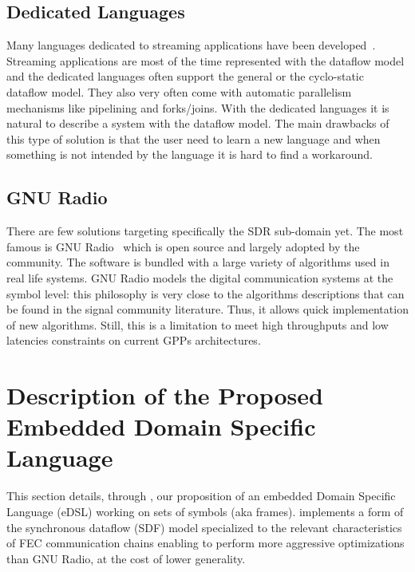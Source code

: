 \subsection{Dedicated Languages}

Many languages dedicated to streaming applications have been
developed~\cite{Buck2004,Amarasinghe2005,Liao2006,Black-Schaffer2010,Glitia2010,
Thies2010,DeOliveiraCastro2017}. Streaming applications are most of the time
represented with the dataflow model and the dedicated languages often support
the general or the cyclo-static dataflow model. They also very often come with
automatic parallelism mechanisms like pipelining and forks/joins. With the
dedicated languages it is natural to describe a system with the dataflow model.
The main drawbacks of this type of solution is that the user need to learn a
new language and when something is not intended by the language it is hard to
find a workaround.

\subsection{GNU Radio}

There are few solutions targeting specifically the SDR sub-domain yet. The most
famous is GNU Radio~\cite{GNURadio} which is open source and largely adopted by
the community. The software is bundled with a large variety of algorithms used
in real life systems. GNU Radio models the digital communication systems at the
symbol level: this philosophy is very close to the algorithms descriptions that
can be found in the signal community literature. Thus, it allows quick
implementation of new algorithms. Still, this is a limitation to meet high
throughputs and low latencies constraints on current GPPs architectures.

\section{Description of the Proposed Embedded Domain Specific Language}

This section details, through \AFFECT, our proposition of an embedded Domain
Specific Language (eDSL) working on sets of symbols (aka frames). \AFFECT
implements a form of the synchronous dataflow (SDF) model specialized to the
relevant characteristics of FEC communication chains enabling to perform more
aggressive optimizations than GNU Radio, at the cost of lower generality.

